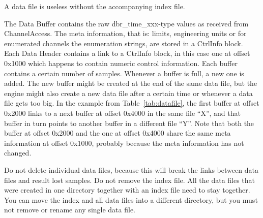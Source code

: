  A data file is useless without the
accompanying index file.

\noindent The Data Buffer contains the raw dbr\_time\_xxx-type values
as received from ChannelAccess. The meta information, that is: limits,
engineering units or for enumerated channels the enumeration strings,
are stored in a CtrlInfo block. Each Data Header contains a link to a
CtrlInfo block, in this case one at offset 0x1000 which happens to
contain numeric control information.
Each buffer contains a certain number of samples. Whenever a buffer is
full, a new one is added. The new buffer might be created at the end
of the same data file, but the engine might also create a new data
file after a certain time or whenever a data file gets too big.
In the example from Table~\ref{tab:datafile}, the first buffer at offset
0x2000 links to a next buffer at offset 0x4000 in the same file ``X'',
and that buffer in turn points to another buffer in a different file
``Y''. Note that both the buffer at offset 0x2000 and the one at
offset 0x4000 share the same meta information at offset 0x1000,
probably because the meta information has not changed.

 Do not delete individual data
files, because this will break the links between data files and result
lost samples. Do not remove the index file. All the data files that were
created in one directory together with an index file need to stay together.
You can move the index and all data files into a different directory, but
you must not remove or rename any single data file.


